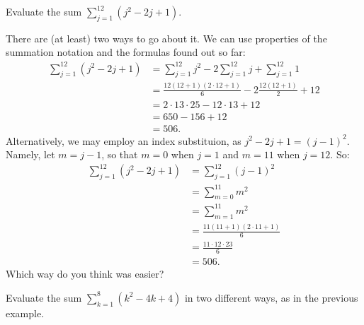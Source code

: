 \documentclass[nooutcomes]{ximera}
\begin{document}
\begin{example}
  Evaluate the sum $\sum_{j=1}^{12} (j^2-2j+1)$.

  \begin{explanation}
    There are (at least) two ways to go about it. We can use properties of the summation notation and the formulas found out so far:
    \begin{align*}
      \sum_{j=1}^{12} (j^2-2j+1) &= \sum_{j=1}^{12}j^2 - 2\sum_{j=1}^{12}j + \sum_{j=1}^{12}1 \\ &= \frac{12(12+1)(2\cdot 12+1)}{6} - 2\frac{12(12+1)}{2} + 12 \\ &= 2\cdot 13\cdot 25 - 12\cdot 13 + 12 \\ &= 650-156+12 \\ &= 506.
    \end{align*}Alternatively, we may employ an index substituion, as $j^2-2j+1 = (j-1)^2$. Namely, let $m=j-1$, so that $m=0$ when $j=1$ and $m=11$ when $j=12$. So:
    \begin{align*}
      \sum_{j=1}^{12}(j^2-2j+1) &= \sum_{j=1}^{12} (j-1)^2 \\ &= \sum_{m=0}^{11} m^2 \\ &= \sum_{m=1}^{11} m^2 \\ &= \frac{11(11+1)(2\cdot 11+1)}{6} \\ &= \frac{11\cdot 12\cdot 23}{6} \\ &= 506.
    \end{align*}
Which way do you think was easier?
  \end{explanation}
\end{example}

\begin{exploration}
  Evaluate the sum $\sum_{k=1}^8 (k^2-4k+4)$ in two different ways, as in the previous example.
\end{exploration}
\end{document}
